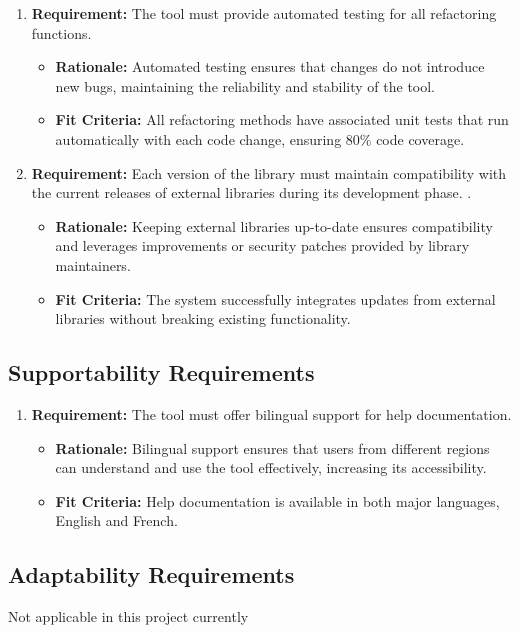 \documentclass[12pt]{article}
\begin{document}
\begin{enumerate}
  \item \textbf{Requirement:} The tool must provide automated testing for all refactoring functions.
     \begin{itemize}
         \item \textbf{Rationale:} Automated testing ensures that changes do not introduce new bugs, maintaining the reliability and stability of the tool.
         \item \textbf{Fit Criteria:} All refactoring methods have associated unit tests that run automatically with each code change, ensuring 80\% code coverage.
     \end{itemize}
     
  \item \textbf{Requirement:} Each version of the library must maintain compatibility with the current releases of external libraries during its development phase. .
     \begin{itemize}
         \item \textbf{Rationale:} Keeping external libraries up-to-date ensures compatibility and leverages improvements or security patches provided by library maintainers.
         \item \textbf{Fit Criteria:} The system successfully integrates updates from external libraries without breaking existing functionality.
     \end{itemize}
  
  \end{enumerate}

\subsection{Supportability Requirements}
\begin{enumerate}
  \item \textbf{Requirement:} The tool must offer bilingual support for help documentation.
  \begin{itemize}
      \item \textbf{Rationale:} Bilingual support ensures that users from different regions can understand and use the tool effectively, increasing its accessibility.
      \item \textbf{Fit Criteria:} Help documentation is available in both major languages, English and French.
  \end{itemize}
  
\end{enumerate}

\subsection{Adaptability Requirements}
Not applicable in this project currently
\end{document}
